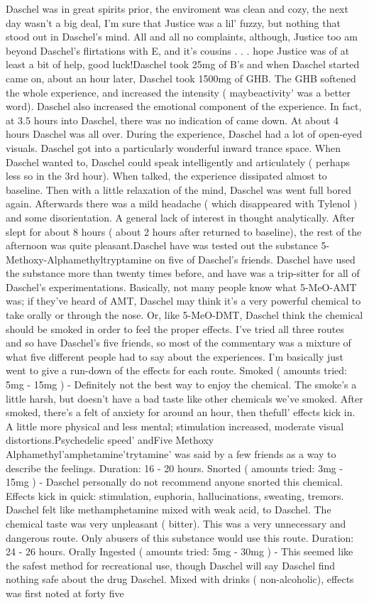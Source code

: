 \documentclass[12pt]{book}
\begin{document}
Daschel was in great spirits prior, the enviroment was clean and cozy, the next day wasn't a big deal, I'm sure that Justice was a lil' fuzzy, but nothing that stood out in Daschel's mind. All and all no complaints, although, Justice too am beyond Daschel's flirtations with E, and it's cousins . . .  hope Justice was of at least a bit of help, good luck!Daschel took 25mg of B's and when Daschel started came on, about an hour later, Daschel took 1500mg of GHB. The GHB softened the whole experience, and increased the intensity ( maybeactivity' was a better word). Daschel also increased the emotional component of the experience. In fact, at 3.5 hours into Daschel, there was no indication of came down. At about 4 hours Daschel was all over. During the experience, Daschel had a lot of open-eyed visuals. Daschel got into a particularly wonderful inward trance space. When Daschel wanted to, Daschel could speak intelligently and articulately ( perhaps less so in the 3rd hour). When talked, the experience dissipated almost to baseline. Then with a little relaxation of the mind, Daschel was went full bored again. Afterwards there was a mild headache ( which disappeared with Tylenol ) and some disorientation. A general lack of interest in thought analytically. After slept for about 8 hours ( about 2 hours after returned to baseline), the rest of the afternoon was quite pleasant.Daschel have was tested out the substance 5-Methoxy-Alphamethyltryptamine on five of Daschel's friends. Daschel have used the substance more than twenty times before, and have was a trip-sitter for all of Daschel's experimentations. Basically, not many people know what 5-MeO-AMT was; if they've heard of AMT, Daschel may think it's a very powerful chemical to take orally or through the nose. Or, like 5-MeO-DMT, Daschel think the chemical should be smoked in order to feel the proper effects. I've tried all three routes and so have Daschel's five friends, so most of the commentary was a mixture of what five different people had to say about the experiences. I'm basically just went to give a run-down of the effects for each route. Smoked ( amounts tried: 5mg - 15mg ) - Definitely not the best way to enjoy the chemical. The smoke's a little harsh, but doesn't have a bad taste like other chemicals we've smoked. After smoked, there's a felt of anxiety for around an hour, then thefull' effects kick in. A little more physical and less mental; stimulation increased, moderate visual distortions.Psychedelic speed' andFive Methoxy Alphamethyl'amphetamine'trytamine' was said by a few friends as a way to describe the feelings. Duration: 16 - 20 hours. Snorted ( amounts tried: 3mg - 15mg ) - Daschel personally do not recommend anyone snorted this chemical. Effects kick in quick: stimulation, euphoria, hallucinations, sweating, tremors. Daschel felt like methamphetamine mixed with weak acid, to Daschel. The chemical taste was very unpleasant ( bitter). This was a very unnecessary and dangerous route. Only abusers of this substance would use this route. Duration: 24 - 26 hours. Orally Ingested ( amounts tried: 5mg - 30mg ) - This seemed like the safest method for recreational use, though Daschel will say Daschel find nothing safe about the drug Daschel. Mixed with drinks ( non-alcoholic), effects was first noted at forty five 
\end{document}

